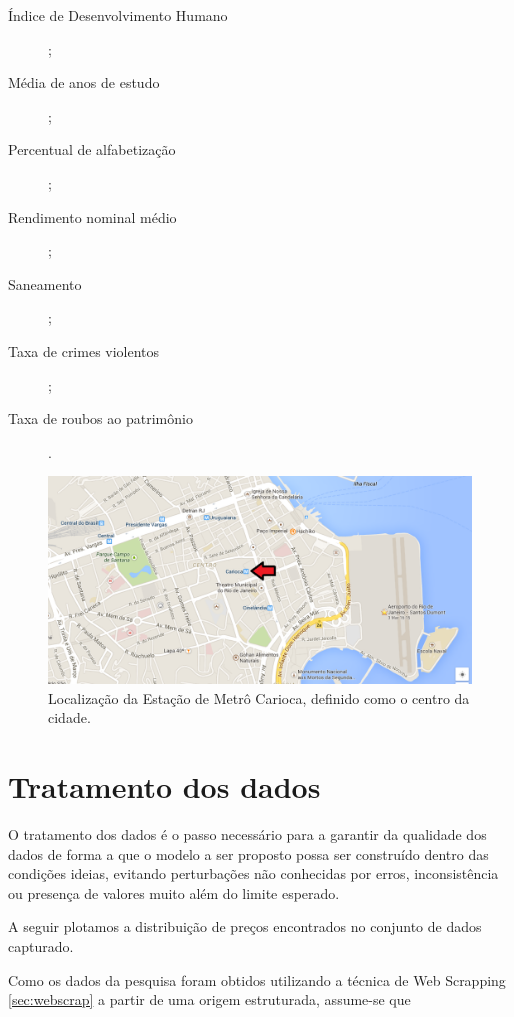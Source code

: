 \begin{description}
\item[Índice de Desenvolvimento Humano];
\item[Média de anos de estudo];
\item[Percentual de alfabetização];
\item[Rendimento nominal médio];
\item[Saneamento];
\item[Taxa de crimes violentos];
\item[Taxa de roubos ao patrimônio].
\end{description}




\begin{figure}[h!]
\centering
\includegraphics[width=1\linewidth]{img/loc_metro_carioca}
\caption{Localização da Estação de Metrô Carioca, definido como o centro da cidade.}
\label{fig:loc_metro_carioca}
\end{figure}


\section{Tratamento dos dados}

O tratamento dos dados é o passo necessário para a garantir da qualidade dos dados de forma a que o modelo a ser proposto possa ser construído dentro das condições ideias, evitando perturbações não conhecidas por erros, inconsistência ou presença de valores muito além do limite esperado.

A seguir plotamos a distribuição de preços encontrados no conjunto de dados capturado.




Como os dados da pesquisa foram obtidos utilizando a técnica de Web Scrapping \ref{sec:webscrap} a partir de uma origem estruturada, assume-se que 